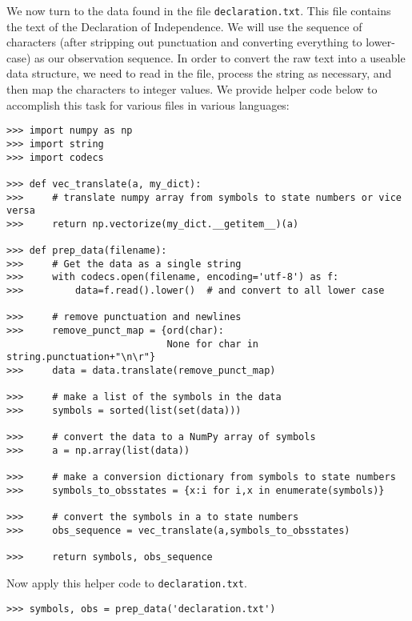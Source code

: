 We now turn to the data found in the file {\tt declaration.txt}.
This file contains the text of the Declaration of Independence.
We will use the sequence of characters (after stripping out punctuation and converting everything to lower-case) as our observation sequence.
In order to convert the raw text into a useable data structure, we need to read in the file, process the string as necessary, and then map the characters to integer values.
We provide helper code below to accomplish this task for various files in various languages:
\begin{lstlisting}
>>> import numpy as np
>>> import string
>>> import codecs

>>> def vec_translate(a, my_dict):
>>>     # translate numpy array from symbols to state numbers or vice versa
>>>     return np.vectorize(my_dict.__getitem__)(a)

>>> def prep_data(filename):
>>>     # Get the data as a single string
>>>     with codecs.open(filename, encoding='utf-8') as f:
>>>         data=f.read().lower()  # and convert to all lower case

>>>     # remove punctuation and newlines
>>>     remove_punct_map = {ord(char): 
                            None for char in string.punctuation+"\n\r"}
>>>     data = data.translate(remove_punct_map)

>>>     # make a list of the symbols in the data
>>>     symbols = sorted(list(set(data)))

>>>     # convert the data to a NumPy array of symbols
>>>     a = np.array(list(data))

>>>     # make a conversion dictionary from symbols to state numbers
>>>     symbols_to_obsstates = {x:i for i,x in enumerate(symbols)}

>>>     # convert the symbols in a to state numbers
>>>     obs_sequence = vec_translate(a,symbols_to_obsstates)

>>>     return symbols, obs_sequence
\end{lstlisting}

Now apply this helper code to \texttt{declaration.txt}.
\begin{lstlisting}
>>> symbols, obs = prep_data('declaration.txt')
\end{lstlisting}

